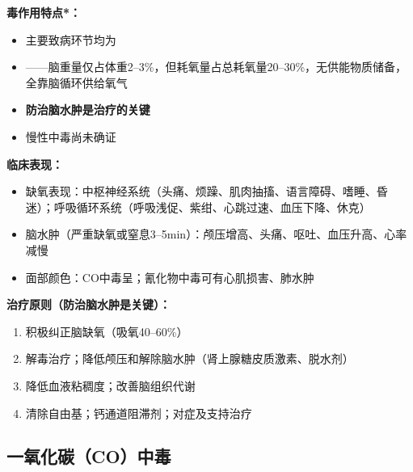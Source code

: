 \begin{keybox}
\textbf{毒作用特点*：}
\begin{itemize}[leftmargin=*]
    \item 主要致病环节均为
    \item {}——脑重量仅占体重2--3\%，但耗氧量占总耗氧量20--30\%，无供能物质储备，全靠脑循环供给氧气
    \item \textbf{防治脑水肿是治疗的关键}
    \item 慢性中毒尚未确证
\end{itemize}

\textbf{临床表现：}
\begin{itemize}[leftmargin=*]
    \item 缺氧表现：中枢神经系统（头痛、烦躁、肌肉抽搐、语言障碍、嗜睡、昏迷）；呼吸循环系统（呼吸浅促、紫绀、心跳过速、血压下降、休克）
    \item 脑水肿（严重缺氧或窒息3--5min）：颅压增高、头痛、呕吐、血压升高、心率减慢
    \item 面部颜色：CO中毒呈；氰化物中毒可有心肌损害、肺水肿
\end{itemize}

\textbf{治疗原则（防治脑水肿是关键）：}
\begin{enumerate}[leftmargin=*]
    \item 积极纠正脑缺氧（吸氧40--60\%）
    \item 解毒治疗；降低颅压和解除脑水肿（肾上腺糖皮质激素、脱水剂）
    \item 降低血液粘稠度；改善脑组织代谢
    \item 清除自由基；钙通道阻滞剂；对症及支持治疗
\end{enumerate}
\end{keybox}

\subsection{一氧化碳（CO）中毒}

